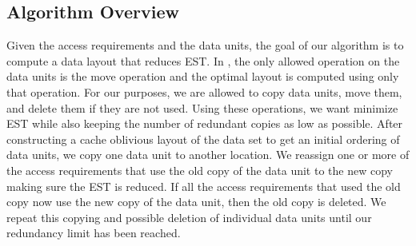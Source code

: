 \subsection{Algorithm Overview}

Given the access requirements and the data units, the goal of our algorithm is to compute a data layout that reduces EST. In \cite{cacheobliviouslayout}, the only allowed operation on the data units is
the move operation and the optimal layout is computed using only that
operation. For our purposes, we are allowed to copy data units, move them, and
delete them if they are not used. Using these operations, we want minimize EST
while also keeping the number of redundant copies as low as possible. After constructing a cache oblivious layout 
of the data set to get an initial ordering of data units, we copy one data unit
to another location. We reassign one or more of the access requirements that
use the old copy of the data unit to the new copy making sure the EST is
reduced.  If all the access requirements that used the old copy now use the
new copy of the data unit, then the old copy is deleted.  We repeat this
copying and possible deletion of individual data units until our redundancy
limit has been reached. 
